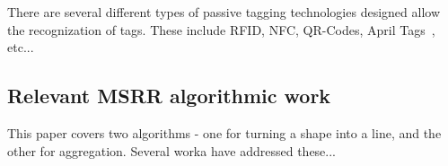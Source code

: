 There are several different types of passive tagging technologies designed allow the recognization of tags. These include RFID, NFC, QR-Codes, April Tags~\cite{wang2016iros}, etc...


\subsection{Relevant MSRR algorithmic work}
\label{sec:RW-Algorithmic}
This paper covers two algorithms - one for turning a shape into a line, and the other for aggregation.
Several worka have addressed these...